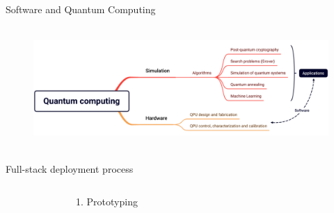 \documentclass[aspectratio=169, 8pt, xcolor={svgnames}, hyperref={linkcolor=black}]{beamer}
\begin{document}
\begin{frame}{Software and Quantum Computing}
   \begin{figure}
     \includegraphics[height=4.7cm]{figures/q1.png}
   \end{figure}
 \end{frame}

\begin{frame}{Full-stack deployment process}
   \begin{columns}
     \column{9.2cm}
     \begin{figure}
     \end{figure}
   \column{6cm}
   \begin{block}{1. Prototyping}

\end{block}
\end{columns}
\end{frame}
\end{document}
